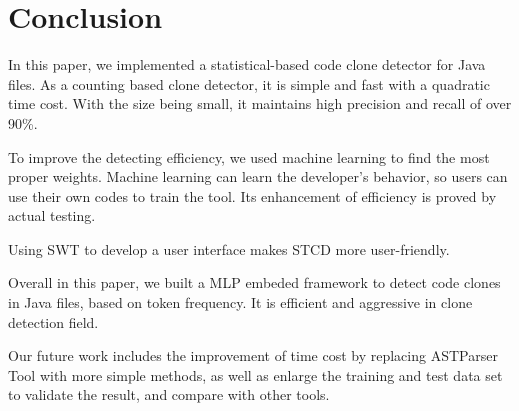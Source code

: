 \documentclass[../main.tex]{subfiles}
\begin{document}
\section{Conclusion}

In this paper, we implemented a statistical-based code clone detector for Java files. As a counting based clone detector, it is simple and fast with a quadratic time cost. With the size being small, it maintains high precision and recall of over 90\%.

To improve the detecting efficiency, we used machine learning to find the most proper weights. Machine learning can learn the developer's behavior, so users can use their own codes to train the tool. Its enhancement of efficiency is proved by actual testing.

Using SWT to develop a user interface makes STCD more user-friendly.

Overall in this paper, we built a MLP embeded framework to detect code clones in Java files, based on token frequency. It is efficient and aggressive in clone detection field.


Our future work includes the improvement of time cost by replacing ASTParser Tool with more simple methods, as well as enlarge the training and test data set to validate the result, and compare with other tools.
\end{document}
